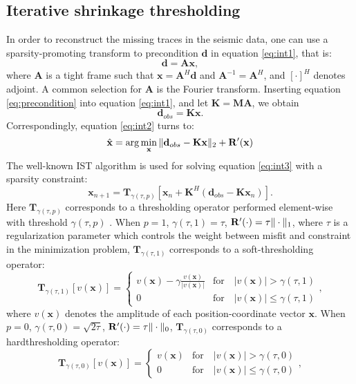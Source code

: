 \subsection{Iterative shrinkage thresholding}
In order to reconstruct the missing traces in the seismic data, one can use a sparsity-promoting transform to precondition $\mathbf{d}$ in equation \ref{eq:int1}, that is:
\begin{equation}
\label{eq:precondition}
\mathbf{d}=\mathbf{Ax},
\end{equation}
where $\mathbf{A}$ is a tight frame such that $\mathbf{x}=\mathbf{A}^{H}\mathbf{d}$ and $\mathbf{A}^{-1}=\mathbf{A}^{H}$, and $[\cdot]^H$ denotes adjoint. A common selection for $\mathbf{A}$ is the Fourier transform.
Inserting equation \ref{eq:precondition} into equation \ref{eq:int1}, and let $\mathbf{K}=\mathbf{MA}$, we obtain 
\begin{equation}
\label{eq:forw2}
\mathbf{d}_{obs} = \mathbf{Kx}.
\end{equation}
Correspondingly, equation \ref{eq:int2} turns to:
\begin{equation}
\label{eq:int3}
\hat{\mathbf{x}} = \arg\min_{\mathbf{x}} \Arrowvert \mathbf{d}_{obs}-\mathbf{Kx} \Arrowvert_2 + \mathbf{R}'(\mathbf{x})
\end{equation}
The well-known IST algorithm is used for solving equation \ref{eq:int3} with a sparsity constraint:
\begin{equation}
\label{eq:ist}
\mathbf{x}_{n+1} = \mathbf{T}_{\gamma(\tau,p)}[\mathbf{x}_n+\mathbf{K}^{H}(\mathbf{d}_{obs}-\mathbf{Kx}_n)].
\end{equation}
Here $\mathbf{T}_{\gamma(\tau,p)}$ corresponds to a thresholding operator performed element-wise with threshold $\gamma(\tau,p)$ \cite[]{pengliang20131}. When $p=1$, $\gamma(\tau,1)=\tau$, $\mathbf{R}'(\cdot)=\tau \Arrowvert \cdot \Arrowvert_1$, where $\tau$ is a regularization parameter which controls the weight between misfit and constraint in the minimization problem, $\mathbf{T}_{\gamma(\tau,1)}$ corresponds to a soft-thresholding operator:
\begin{equation}
\label{eq:soft}
\mathbf{T}_{\gamma(\tau,1)}[v(\mathbf{x})] = \left\{ \begin{array}{ll}
v(\mathbf{x})-\gamma \frac{v(\mathbf{x})}{|v(\mathbf{x})|} & \text{for}\quad  |v(\mathbf{x})| > \gamma(\tau,1)  \\
0			      & \text{for}\quad  |v(\mathbf{x})| \le \gamma(\tau,1)
\end{array}\right.,
\end{equation} 
where $v(\mathbf{x})$ denotes the amplitude of each position-coordinate vector $\mathbf{x}$.
 When $p=0$, $\gamma(\tau,0)=\sqrt{2\tau}$, $\mathbf{R}'(\cdot)=\tau \Arrowvert \cdot \Arrowvert_0$, $\mathbf{T}_{\gamma(\tau,0)}$ corresponds to a hard\wen{-}thresholding operator:
\begin{equation}
\label{eq:hard}
\mathbf{T}_{\gamma(\tau,0)}[v(\mathbf{x})] = \left\{ \begin{array}{ll}
v(\mathbf{x}) 	 & \text{for}\quad  |v(\mathbf{x})| > \gamma(\tau,0)  \\
0			      & \text{for}\quad  |v(\mathbf{x})| \le \gamma(\tau,0)
\end{array}\right.,
\end{equation}
